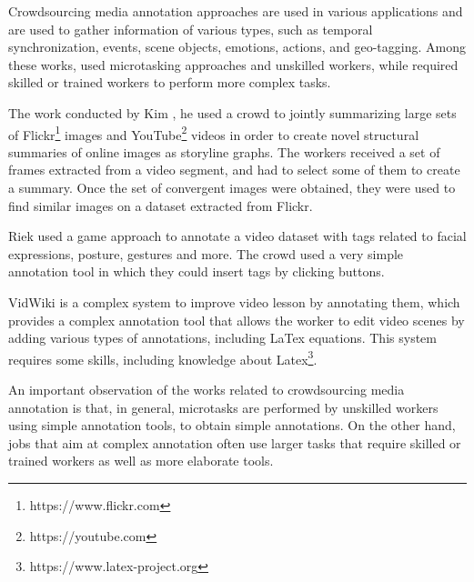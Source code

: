 Crowdsourcing media annotation approaches are used in various applications and are used to gather information of various types, such as temporal synchronization\cite{wu2014crowdsourced}, events\cite{Kim:2014:JSL:2679600.2680027}, scene objects\cite{vidwiki2014}, emotions\cite{biel2013youtube}, actions\cite{riek2011guess}, and geo-tagging\cite{gottlieb2012pushing}. Among these works, \cite{Kim:2014:JSL:2679600.2680027,riek2011guess,wu2014crowdsourced} used microtasking approaches and unskilled workers, while \cite{vidwiki2014,biel2013youtube,gottlieb2012pushing} required skilled or trained workers to perform more complex tasks.

The work conducted by Kim \cite{Kim:2014:JSL:2679600.2680027}, he used a crowd to jointly summarizing large sets of Flickr\footnote{https://www.flickr.com} images and YouTube\footnote{https://youtube.com} videos in order to create novel structural summaries of online images as storyline graphs. The workers received a set of frames extracted from a video segment, and had to select some of them to create a summary. Once the set of convergent images were obtained, they were used to find similar images on a dataset extracted from Flickr.

Riek used a game approach \cite{riek2011guess} to annotate a video dataset with tags related to facial expressions, posture, gestures and more. The crowd used a very simple annotation tool in which they could insert tags by clicking buttons.

VidWiki\cite{vidwiki2014} is a complex system to improve video lesson by annotating them, which provides a complex annotation tool that allows the worker to edit video scenes by adding various types of annotations, including LaTex equations. This system requires some skills, including knowledge about Latex\footnote{https://www.latex-project.org}.

An important observation of the works related to crowdsourcing media annotation is that, in general, microtasks are performed by unskilled workers using simple annotation tools, to obtain simple annotations. On the other hand, jobs that aim at complex annotation often use larger tasks that require skilled or trained workers as well as more elaborate tools.